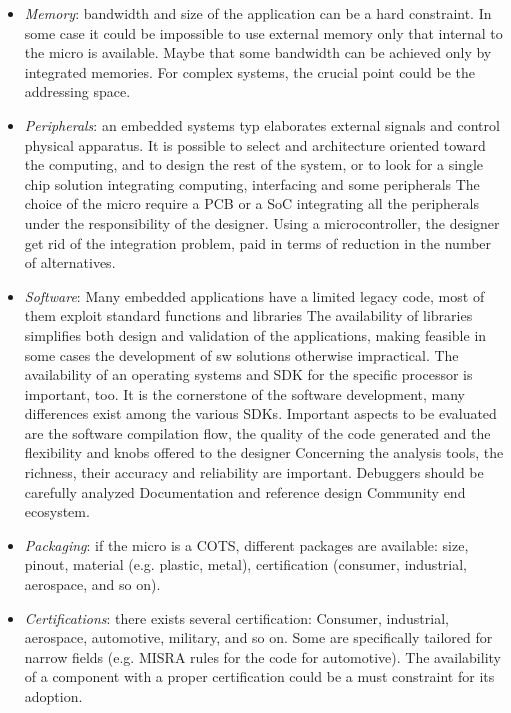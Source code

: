\begin{itemize}
    \item \textit{Memory}: bandwidth and size of the application can be a hard constraint.
        In some case it could be impossible to use external memory only that internal to the micro is available.
        Maybe that some bandwidth can be achieved only by integrated memories.
        For complex systems, the crucial point could be the addressing space.
    \item \textit{Peripherals}: an embedded systems typ elaborates external signals and control physical apparatus. 
        It is possible to select and architecture oriented toward the computing, and to design the rest of the system, or to look for a single chip solution integrating computing, interfacing and some peripherals
        The choice of the micro require a PCB or a SoC integrating all the peripherals under the responsibility of the designer.
        Using a microcontroller, the designer get rid of the integration problem, paid in terms of reduction in the number of alternatives.
    \item \textit{Software}: Many embedded applications have a limited legacy code, most of them exploit standard functions and libraries
        The availability of libraries simplifies both design and validation of the applications, making feasible in some cases the development of sw solutions otherwise impractical.
        The availability of an operating systems and SDK for the specific processor is important, too.
        It is the cornerstone of the software development, many differences exist among the various SDKs. 
        Important aspects to be evaluated are the software compilation flow, the quality of the code generated and the flexibility and knobs offered to the designer
        Concerning the analysis tools, the richness, their accuracy and reliability are important. 
        Debuggers should be carefully analyzed
        Documentation and reference design
        Community end ecosystem.
    \item \textit{Packaging}: if the micro is a COTS, different packages are available: size, pinout, material (e.g. plastic, metal), certification (consumer, industrial, aerospace, and so on).
    \item \textit{Certifications}: there exists several certification: Consumer, industrial, aerospace, automotive, military, and so on.
        Some are specifically tailored for narrow fields (e.g. MISRA rules for the code for automotive).
        The availability of a component with a proper certification could be a must constraint for its adoption.
\end{itemize}
